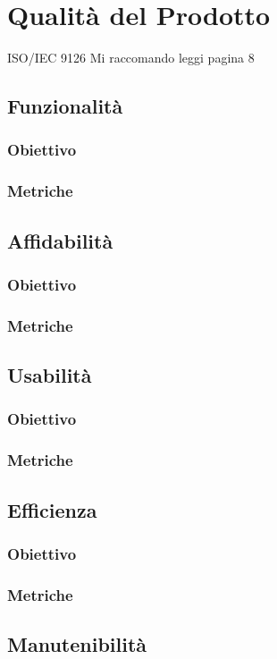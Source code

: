 \section{Qualità del Prodotto}
ISO/IEC 9126
Mi raccomando leggi pagina 8
\subsection{Funzionalità}
\subsubsection{Obiettivo}
\subsubsection{Metriche}
\subsection{Affidabilità}
\subsubsection{Obiettivo}
\subsubsection{Metriche}
\subsection{Usabilità}
\subsubsection{Obiettivo}
\subsubsection{Metriche}
\subsection{Efficienza}
\subsubsection{Obiettivo}
\subsubsection{Metriche}
\subsection{Manutenibilità}
